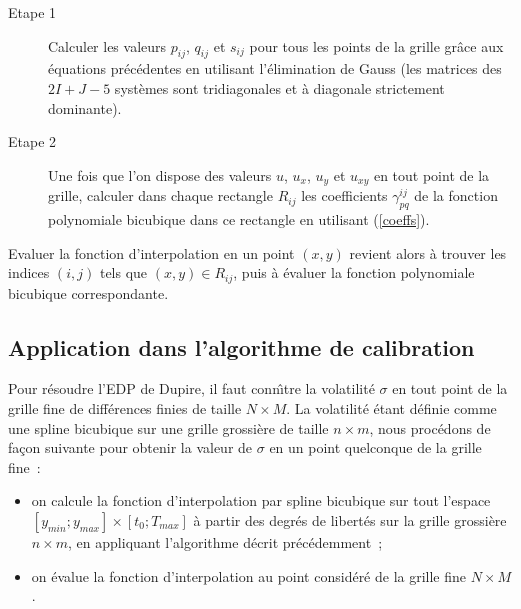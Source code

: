 \begin{description}
\item[Etape 1] Calculer les valeurs $p_{ij}$, $q_{ij}$ et $s_{ij}$ 
pour tous les points de la grille gr\^ace aux \'equations 
pr\'ec\'edentes en utilisant l'\'elimination de Gauss (les matrices 
des $2I+J-5$ syst\`emes sont tridiagonales et \`a diagonale 
strictement dominante).
\item[Etape 2] Une fois que l'on dispose des valeurs $u$, $u_x$, 
$u_y$ et $u_{xy}$ en tout point de la grille, calculer dans chaque 
rectangle $R_{ij}$ les coefficients $\gamma_{pq}^{ij}$ de la fonction 
polynomiale bicubique dans ce rectangle en utilisant (\ref{coeffs}). 
\end{description}
Evaluer la fonction d'interpolation en un point $(x,y)$ revient 
alors \`a trouver les indices $(i,j)$ tels que $(x,y) \in R_{ij}$, 
puis \`a \'evaluer la fonction polynomiale bicubique correspondante.

\subsection{Application dans l'algorithme de calibration}

Pour r\'esoudre l'EDP de Dupire, il faut conn\^{\i}tre la 
volatilit\'e $\sigma$ en tout point de la grille fine de 
diff\'erences finies de taille $N \times M$. La volatilit\'e \'etant 
d\'efinie comme une spline bicubique sur une grille grossi\`ere de 
taille $n \times m$, nous proc\'edons de fa\c con suivante pour 
obtenir la valeur de $\sigma$ en un point quelconque de la grille 
fine~: 
\begin{itemize}
\item on calcule la fonction d'interpolation par spline bicubique sur 
tout l'espace $[y_{min};y_{max}]\times [t_0;T_{max}]$ \`a partir des 
degr\'es de libert\'es sur la grille grossi\`ere $n \times m$, en 
appliquant l'algorithme d\'ecrit pr\'ec\'edemment~;
\item on \'evalue la fonction d'interpolation au point consid\'er\'e 
de la grille fine $N \times M$.
\end{itemize}
